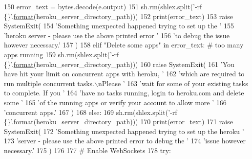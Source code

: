 \begin{DoxyCode}
150                     error\_text = bytes.decode(e.output)
151                     sh.rm(shlex.split(\textcolor{stringliteral}{'-rf \{\}'}.\hyperlink{namespaceparlai_1_1chat__service_1_1services_1_1messenger_1_1shared__utils_a32e2e2022b824fbaf80c747160b52a76}{format}(heroku\_server\_directory\_path)))
152                     print(error\_text)
153                     \textcolor{keywordflow}{raise} SystemExit(
154                         \textcolor{stringliteral}{'Something unexpected happened trying to set up the '}
155                         \textcolor{stringliteral}{'heroku server - please use the above printed error '}
156                         \textcolor{stringliteral}{'to debug the issue however necessary.'}
157                     )
158         \textcolor{keywordflow}{elif} \textcolor{stringliteral}{"Delete some apps"} \textcolor{keywordflow}{in} error\_text:  \textcolor{comment}{# too many apps running}
159             sh.rm(shlex.split(\textcolor{stringliteral}{'-rf \{\}'}.\hyperlink{namespaceparlai_1_1chat__service_1_1services_1_1messenger_1_1shared__utils_a32e2e2022b824fbaf80c747160b52a76}{format}(heroku\_server\_directory\_path)))
160             \textcolor{keywordflow}{raise} SystemExit(
161                 \textcolor{stringliteral}{'You have hit your limit on concurrent apps with heroku, '}
162                 \textcolor{stringliteral}{'which are required to run multiple concurrent tasks.\(\backslash\)nPlease '}
163                 \textcolor{stringliteral}{'wait for some of your existing tasks to complete. If you '}
164                 \textcolor{stringliteral}{'have no tasks running, login to heroku.com and delete some '}
165                 \textcolor{stringliteral}{'of the running apps or verify your account to allow more '}
166                 \textcolor{stringliteral}{'concurrent apps.'}
167             )
168         \textcolor{keywordflow}{else}:
169             sh.rm(shlex.split(\textcolor{stringliteral}{'-rf \{\}'}.\hyperlink{namespaceparlai_1_1chat__service_1_1services_1_1messenger_1_1shared__utils_a32e2e2022b824fbaf80c747160b52a76}{format}(heroku\_server\_directory\_path)))
170             print(error\_text)
171             \textcolor{keywordflow}{raise} SystemExit(
172                 \textcolor{stringliteral}{'Something unexpected happened trying to set up the heroku '}
173                 \textcolor{stringliteral}{'server - please use the above printed error to debug the '}
174                 \textcolor{stringliteral}{'issue however necessary.'}
175             )
176 
177     \textcolor{comment}{# Enable WebSockets}
178     \textcolor{keywordflow}{try}:

\end{DoxyCode}
